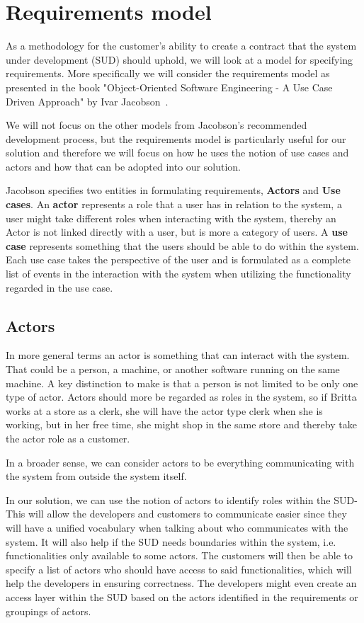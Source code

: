 \section{Requirements model}

As a methodology for the customer's ability to create a contract that the system under development (SUD) should uphold, we will look at a model for specifying requirements.
More specifically we will consider the requirements model as presented in the book "Object-Oriented Software Engineering - A Use Case Driven Approach" by Ivar Jacobson~\cite{Jacobson1992}.

We will not focus on the other models from Jacobson's recommended development process, but the requirements model is particularly useful for our solution and therefore we will focus on how he uses the notion of use cases and actors and how that can be adopted into our solution.

Jacobson specifies two entities in formulating requirements, \textbf{Actors} and \textbf{Use cases}.
An \textbf{actor} represents a role that a user has in relation to the system, a user might take different roles when interacting with the system, thereby an Actor is not linked directly with a user, but is more a category of users.
A \textbf{use case} represents something that the users should be able to do within the system. Each use case takes the perspective of the user and is formulated as a complete list of events in the interaction with the system when utilizing the functionality regarded in the use case.

\subsection{Actors}
In more general terms an actor is something that can interact with the system. That could be a person, a machine, or another software running on the same machine. 
A key distinction to make is that a person is not limited to be only one type of actor.
Actors should more be regarded as roles in the system, so if Britta works at a store as a clerk, she will have the actor type clerk when she is working, but in her free time, she might shop in the same store and thereby take the actor role as a customer. 

In a broader sense, we can consider actors to be everything communicating with the system from outside the system itself.

In our solution, we can use the notion of actors to identify roles within the SUD- 
This will allow the developers and customers to communicate easier since they will have a unified vocabulary when talking about who communicates with the system. 
It will also help if the SUD needs boundaries within the system, i.e. functionalities only available to some actors.
The customers will then be able to specify a list of actors who should have access to said functionalities, which will help the developers in ensuring correctness.
The developers might even create an access layer within the SUD based on the actors identified in the requirements or groupings of actors.

